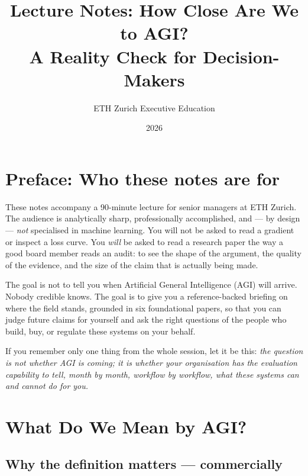 \documentclass[11pt,a4paper]{article}
\title{\textbf{Lecture Notes: How Close Are We to AGI?}\\[0.3em]
  \large A Reality Check for Decision-Makers}
\author{ETH Zurich Executive Education}
\date{2026}
\begin{document}
\maketitle
\tableofcontents
\newpage

\section*{Preface: Who these notes are for}

These notes accompany a 90-minute lecture for senior managers at ETH
Zurich. The audience is analytically sharp, professionally accomplished,
and --- by design --- \emph{not} specialised in machine learning. You
will not be asked to read a gradient or inspect a loss curve. You
\emph{will} be asked to read a research paper the way a good board
member reads an audit: to see the shape of the argument, the quality of
the evidence, and the size of the claim that is actually being made.

The goal is not to tell you when Artificial General Intelligence (AGI)
will arrive. Nobody credible knows. The goal is to give you a
reference-backed briefing on where the field stands, grounded in six
foundational papers, so that you can judge future claims for yourself
and ask the right questions of the people who build, buy, or regulate
these systems on your behalf.

If you remember only one thing from the whole session, let it be this:
\emph{the question is not whether AGI is coming; it is whether your
organisation has the evaluation capability to tell, month by month,
workflow by workflow, what these systems can and cannot do for you.}

\section{What Do We Mean by AGI?}\label{sec:act1}

\subsection{Why the definition matters --- commercially}
\end{document}
